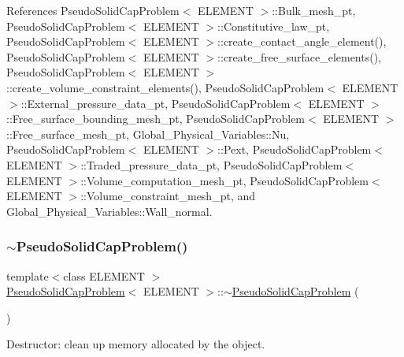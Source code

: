 References Pseudo\+Solid\+Cap\+Problem$<$ E\+L\+E\+M\+E\+N\+T $>$\+::\+Bulk\+\_\+mesh\+\_\+pt, Pseudo\+Solid\+Cap\+Problem$<$ E\+L\+E\+M\+E\+N\+T $>$\+::\+Constitutive\+\_\+law\+\_\+pt, Pseudo\+Solid\+Cap\+Problem$<$ E\+L\+E\+M\+E\+N\+T $>$\+::create\+\_\+contact\+\_\+angle\+\_\+element(), Pseudo\+Solid\+Cap\+Problem$<$ E\+L\+E\+M\+E\+N\+T $>$\+::create\+\_\+free\+\_\+surface\+\_\+elements(), Pseudo\+Solid\+Cap\+Problem$<$ E\+L\+E\+M\+E\+N\+T $>$\+::create\+\_\+volume\+\_\+constraint\+\_\+elements(), Pseudo\+Solid\+Cap\+Problem$<$ E\+L\+E\+M\+E\+N\+T $>$\+::\+External\+\_\+pressure\+\_\+data\+\_\+pt, Pseudo\+Solid\+Cap\+Problem$<$ E\+L\+E\+M\+E\+N\+T $>$\+::\+Free\+\_\+surface\+\_\+bounding\+\_\+mesh\+\_\+pt, Pseudo\+Solid\+Cap\+Problem$<$ E\+L\+E\+M\+E\+N\+T $>$\+::\+Free\+\_\+surface\+\_\+mesh\+\_\+pt, Global\+\_\+\+Physical\+\_\+\+Variables\+::\+Nu, Pseudo\+Solid\+Cap\+Problem$<$ E\+L\+E\+M\+E\+N\+T $>$\+::\+Pext, Pseudo\+Solid\+Cap\+Problem$<$ E\+L\+E\+M\+E\+N\+T $>$\+::\+Traded\+\_\+pressure\+\_\+data\+\_\+pt, Pseudo\+Solid\+Cap\+Problem$<$ E\+L\+E\+M\+E\+N\+T $>$\+::\+Volume\+\_\+computation\+\_\+mesh\+\_\+pt, Pseudo\+Solid\+Cap\+Problem$<$ E\+L\+E\+M\+E\+N\+T $>$\+::\+Volume\+\_\+constraint\+\_\+mesh\+\_\+pt, and Global\+\_\+\+Physical\+\_\+\+Variables\+::\+Wall\+\_\+normal.

\mbox{\label{classPseudoSolidCapProblem_aec2a79e44dfd785b2978419210b053b8}} 
\subsubsection{\texorpdfstring{$\sim$\+Pseudo\+Solid\+Cap\+Problem()}{~PseudoSolidCapProblem()}}
{\footnotesize\ttfamily template$<$class E\+L\+E\+M\+E\+NT $>$ \\
\hyperlink{classPseudoSolidCapProblem}{Pseudo\+Solid\+Cap\+Problem}$<$ E\+L\+E\+M\+E\+NT $>$\+::$\sim$\hyperlink{classPseudoSolidCapProblem}{Pseudo\+Solid\+Cap\+Problem} (\begin{DoxyParamCaption}{ }\end{DoxyParamCaption})}



Destructor\+: clean up memory allocated by the object. 


